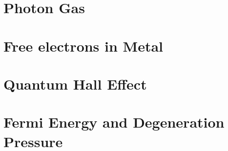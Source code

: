 \section{Photon Gas}
\section{Free electrons in Metal}
\section{Quantum Hall Effect}
\section{Fermi Energy and Degeneration Pressure}
